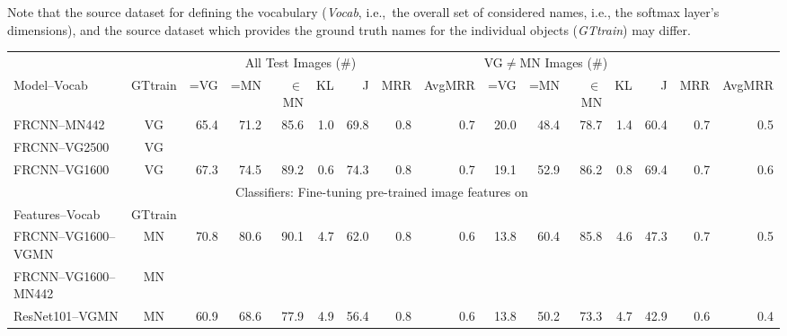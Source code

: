 Note that the source dataset for defining the vocabulary (\textsl{Vocab}, i.e.,\ the overall set of considered names, i.e., the softmax layer's dimensions), and the source dataset which provides the ground truth names for the individual objects (\textsl{GTtrain}) may differ.  
\begin{table}[t]
	\centering
	\small
	\begin{tabular}{l|c|r@{~}r@{~}r@{~}r@{~}r@{~}r@{~}r|@{~}r@{~}r@{~}r@{~}r@{~}r@{~}r@{~}r@{~}}
		\toprule
		&   & \multicolumn{6}{c}{All Test Images ($\#$)} 
		& \multicolumn{6}{c}{VG$\neq$MN Images ($\#$)}\\	
		Model--Vocab	 
		&  GTtrain &  =VG & =MN & $\in$MN  & KL & J & MRR & AvgMRR 
		&  =VG & =MN & $\in$MN  & KL & J & MRR & AvgMRR\\ 
		\midrule
		FRCNN--MN442 & VG &            65.4 &              71.2 &                85.6 &         1.0 &             69.8 &          0.8 &             0.7 &            20.0 &              48.4 &                78.7 &         1.4 &             60.4 &          0.7 &             0.5 \\
		FRCNN--VG2500 & VG \\
		FRCNN--VG1600 & VG &            67.3 &              74.5 &                89.2 &         0.6 &             74.3 &          0.8 &             0.7 &            19.1 &              52.9 &                86.2 &         0.8 &             69.4 &          0.7 &             0.6 \\
		\midrule \midrule
		& \multicolumn{12}{c}{Classifiers: Fine-tuning pre-trained image features on \mn}\\
		Features--Vocab & GTtrain  \\
		\midrule 
		FRCNN--VG1600--VGMN & MN &            70.8 &              80.6 &                90.1 &         4.7 &             62.0 &          0.8 &             0.6 &            13.8 &              60.4 &                85.8 &         4.6 &             47.3 &          0.7 &             0.5 \\ 
		FRCNN--VG1600--MN442 &  MN \\
		\midrule
		ResNet101--VGMN & MN  &            60.9 &              68.6 &                77.9 &         4.9 &             56.4 &          0.8 &             0.6 &            13.8 &              50.2 &                73.3 &         4.7 &             42.9 &          0.6 &             0.4 \\
		

\end{tabular}
\end{table}
